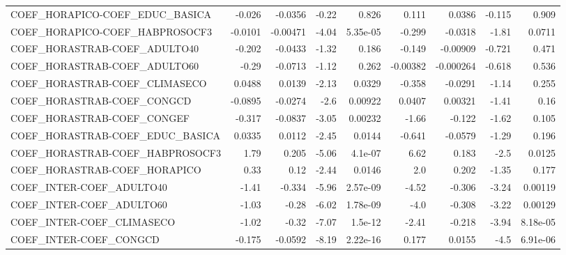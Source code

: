 \begin{tabular}{lrrrrrrrr}
COEF\_HORAPICO-COEF\_EDUC\_BASICA    &      -0.026 &      -0.0356 &   -0.22 &    0.826 &      0.111 &      0.0386 &       -0.115 &         0.909 \\
COEF\_HORAPICO-COEF\_HABPROSOCF3    &     -0.0101 &     -0.00471 &   -4.04 & 5.35e-05 &     -0.299 &     -0.0318 &        -1.81 &        0.0711 \\
COEF\_HORASTRAB-COEF\_ADULTO40      &      -0.202 &      -0.0433 &   -1.32 &    0.186 &     -0.149 &    -0.00909 &       -0.721 &         0.471 \\
COEF\_HORASTRAB-COEF\_ADULTO60      &       -0.29 &      -0.0713 &   -1.12 &    0.262 &   -0.00382 &   -0.000264 &       -0.618 &         0.536 \\
COEF\_HORASTRAB-COEF\_CLIMASECO     &      0.0488 &       0.0139 &   -2.13 &   0.0329 &     -0.358 &     -0.0291 &        -1.14 &         0.255 \\
COEF\_HORASTRAB-COEF\_CONGCD        &     -0.0895 &      -0.0274 &    -2.6 &  0.00922 &     0.0407 &     0.00321 &        -1.41 &          0.16 \\
COEF\_HORASTRAB-COEF\_CONGEF        &      -0.317 &      -0.0837 &   -3.05 &  0.00232 &      -1.66 &      -0.122 &        -1.62 &         0.105 \\
COEF\_HORASTRAB-COEF\_EDUC\_BASICA   &      0.0335 &       0.0112 &   -2.45 &   0.0144 &     -0.641 &     -0.0579 &        -1.29 &         0.196 \\
COEF\_HORASTRAB-COEF\_HABPROSOCF3   &        1.79 &        0.205 &   -5.06 &  4.1e-07 &       6.62 &       0.183 &         -2.5 &        0.0125 \\
COEF\_HORASTRAB-COEF\_HORAPICO      &        0.33 &         0.12 &   -2.44 &   0.0146 &        2.0 &       0.202 &        -1.35 &         0.177 \\
COEF\_INTER-COEF\_ADULTO40          &       -1.41 &       -0.334 &   -5.96 & 2.57e-09 &      -4.52 &      -0.306 &        -3.24 &       0.00119 \\
COEF\_INTER-COEF\_ADULTO60          &       -1.03 &        -0.28 &   -6.02 & 1.78e-09 &       -4.0 &      -0.308 &        -3.22 &       0.00129 \\
COEF\_INTER-COEF\_CLIMASECO         &       -1.02 &        -0.32 &   -7.07 &  1.5e-12 &      -2.41 &      -0.218 &        -3.94 &      8.18e-05 \\
COEF\_INTER-COEF\_CONGCD            &      -0.175 &      -0.0592 &   -8.19 & 2.22e-16 &      0.177 &      0.0155 &         -4.5 &      6.91e-06 \\

\end{tabular}
